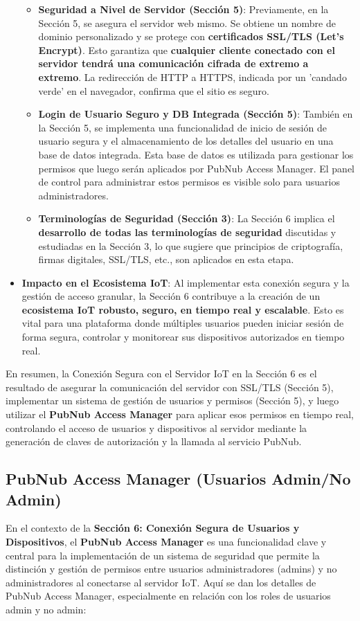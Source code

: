 \documentclass{report}
\begin{document}
\begin{itemize}
\begin{itemize}
        \item \textbf{Seguridad a Nivel de Servidor (Sección 5)}: Previamente, en la Sección 5, se asegura el servidor web mismo. Se obtiene un nombre 
        de dominio personalizado y se protege con \textbf{certificados SSL/TLS (Let's Encrypt)}. Esto garantiza que \textbf{cualquier cliente conectado 
        con el servidor tendrá una comunicación cifrada de extremo a extremo}. La redirección de HTTP a HTTPS, indicada por un  'candado verde' en el 
        navegador, confirma que el sitio es seguro.
        \item \textbf{Login de Usuario Seguro y DB Integrada (Sección 5)}: También en la Sección 5, se implementa una funcionalidad de inicio de sesión 
        de usuario segura y el almacenamiento de los detalles del usuario en una base de datos integrada. Esta base de datos es utilizada para gestionar 
        los permisos que luego serán aplicados por PubNub Access Manager. El panel de control para administrar estos permisos es visible solo para usuarios 
        administradores.
        \item \textbf{Terminologías de Seguridad (Sección 3)}: La Sección 6 implica el \textbf{desarrollo de todas las terminologías de seguridad} 
        discutidas y estudiadas en la Sección 3, lo que sugiere que principios de criptografía, firmas digitales, SSL/TLS, etc., son aplicados en esta etapa.
    \end{itemize}
    \item \textbf{Impacto en el Ecosistema IoT}: Al implementar esta conexión segura y la gestión de acceso granular, la Sección 6 contribuye a la 
    creación de un \textbf{ecosistema IoT robusto, seguro, en tiempo real y escalable}. Esto es vital para una plataforma donde múltiples usuarios 
    pueden iniciar sesión de forma segura, controlar y monitorear sus dispositivos autorizados en tiempo real.
\end{itemize}
En resumen, la Conexión Segura con el Servidor IoT en la Sección 6 es el resultado de asegurar la comunicación del servidor con SSL/TLS (Sección 5), 
implementar un sistema de gestión de usuarios y permisos (Sección 5), y luego utilizar el \textbf{PubNub Access Manager} para aplicar esos permisos 
en tiempo real, controlando el acceso de usuarios y dispositivos al servidor mediante la generación de claves de autorización y la llamada al servicio PubNub.

\subsection{PubNub Access Manager (Usuarios Admin/No Admin)}
En el contexto de la \textbf{Sección 6: Conexión Segura de Usuarios y Dispositivos}, el \textbf{PubNub Access Manager} es una funcionalidad clave y 
central para la implementación de un sistema de seguridad que permite la distinción y gestión de permisos entre usuarios administradores (admins) y 
no administradores al conectarse al servidor IoT. Aquí se dan los detalles de PubNub Access Manager, especialmente en relación con los roles de 
usuarios admin y no admin:
\end{document}
